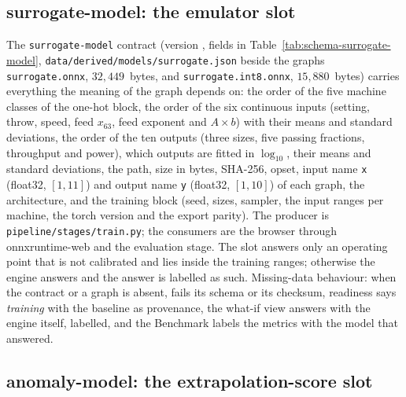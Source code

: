 \subsection{surrogate-model: the emulator slot}\label{sec:data-surrogate}

The \texttt{surrogate-model} contract (version , fields in Table~\ref{tab:schema-surrogate-model}, \texttt{data/\allowbreak{}derived/\allowbreak{}models/\allowbreak{}surrogate.json} beside the graphs
\texttt{surrogate.onnx}, $32{,}449$~bytes, and \texttt{surrogate.int8.onnx}, $15{,}880$~bytes) carries everything the meaning of
the graph depends on: the order of the five machine classes of the one-hot block, the order of the six continuous inputs (setting,
throw, speed, feed $x_{63}$, feed exponent and $A\times b$) with their means and standard deviations, the order of the ten outputs
(three sizes, five passing fractions, throughput and power), which outputs are fitted in $\log_{10}$, their means and standard
deviations, the path, size in bytes, SHA-256, opset, input name \texttt{x} (float32, $[1,11]$) and output name \texttt{y}
(float32, $[1,10]$) of each graph, the architecture, and the training block (seed, sizes, sampler, the input ranges per machine,
the torch version and the export parity). The producer is \texttt{pipeline/\allowbreak{}stages/\allowbreak{}train.py}; the consumers are the browser
through onnxruntime-web and the evaluation stage. The slot answers only an operating point that is not calibrated and lies inside
the training ranges; otherwise the engine answers and the answer is labelled as such. Missing-data behaviour: when the contract or
a graph is absent, fails its schema or its checksum, readiness says \emph{training} with the baseline as provenance, the what-if
view answers with the engine itself, labelled, and the Benchmark labels the metrics with the model that answered.

\subsection{anomaly-model: the extrapolation-score slot}\label{sec:data-anomaly}


